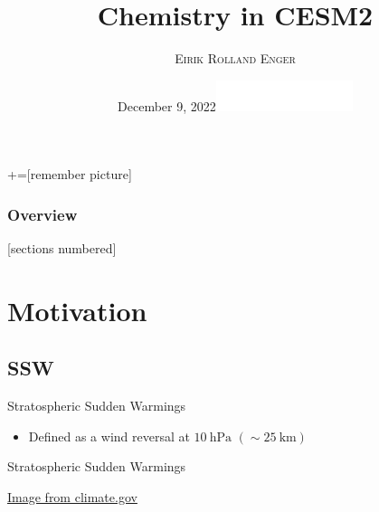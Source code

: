 \documentclass[xcolor=dvipsnames]{beamer} %
\title[Chemistry in CESM2]{Chemistry in CESM2}
\author{\textsc{Eirik Rolland Enger}}
\date{\vspace{-3mm}December 9, 2022\hfill\includegraphics[width=4cm]{utils/CSU-Official-wrdmrk-Rev-2.png}}
\begin{document}
\maketitle

+=[remember picture]
\everymath{\displaystyle}

\begin{frame}%
	\frametitle{Overview}

	[sections numbered]
	\tableofcontents[hideallsubsections]

\end{frame}

\section{Motivation}

\subsection{SSW}
\begin{frame}{Stratospheric Sudden Warmings}
	\begin{itemize}
		\item Defined as a wind reversal at $ \SI{10}{\hecto\pascal} $ $ (\sim\SI{25}{\kilo\metre}) $
	\end{itemize}
\end{frame}

\begin{frame}{Stratospheric Sudden Warmings}
	\begin{center}
		{\tiny\href{https://www.climate.gov/news-features/blogs/enso/polar-vortex-going-make-you-put-sweater-be-afraid-be-very-afraid#:~:text=Thus\%2C\%20the\%20tropospheric\%20polar\%20vortex,that\%20separates\%20the\%20air\%20masses.}{Image from climate.gov}}
	\end{center}
\end{frame}
\end{document}
